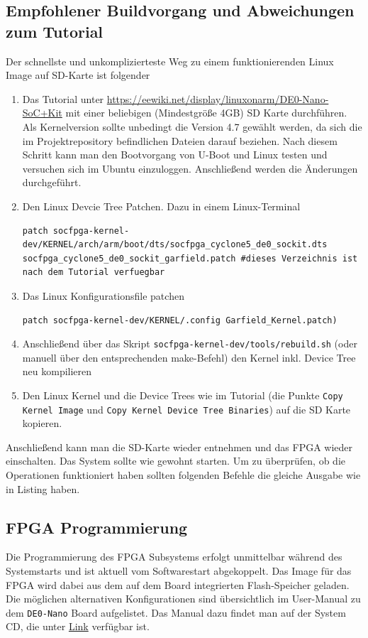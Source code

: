 \subsection{Empfohlener Buildvorgang und Abweichungen zum Tutorial}
Der schnellste und unkomplizierteste Weg zu einem funktionierenden Linux Image auf SD-Karte ist folgender
\begin{enumerate}
	\item Das Tutorial unter \href{https://eewiki.net/display/linuxonarm/DE0-Nano-SoC+Kit}{https://eewiki.net/display/linuxonarm/DE0-Nano-SoC+Kit} mit einer beliebigen (Mindestgröße 4GB) SD Karte durchführen. Als Kernelversion sollte unbedingt die Version 4.7 gewählt werden, da sich die im Projektrepository befindlichen Dateien darauf beziehen. Nach diesem Schritt kann man den Bootvorgang von U-Boot und Linux testen und versuchen sich im Ubuntu einzuloggen. Anschließend werden die Änderungen durchgeführt.
	\item Den Linux Devcie Tree Patchen. Dazu in einem Linux-Terminal
\lstset{language=bash}
	\begin{lstlisting}[breaklines=true]
patch socfpga-kernel-dev/KERNEL/arch/arm/boot/dts/socfpga_cyclone5_de0_sockit.dts socfpga_cyclone5_de0_sockit_garfield.patch #dieses Verzeichnis ist nach dem Tutorial verfuegbar
	\end{lstlisting}
	\item Das Linux Konfigurationsfile patchen
	\begin{lstlisting}[breaklines=true]
patch socfpga-kernel-dev/KERNEL/.config Garfield_Kernel.patch)
	\end{lstlisting}
	\item Anschließend über das Skript \texttt{socfpga-kernel-dev/tools/rebuild.sh} (oder manuell über den entsprechenden make-Befehl) den Kernel inkl. Device Tree neu kompilieren
	\item Den Linux Kernel und die Device Trees wie im Tutorial (die Punkte \texttt{Copy Kernel Image} und \texttt{Copy Kernel Device Tree Binaries}) auf die SD Karte kopieren.
\end{enumerate}

Anschließend kann man die SD-Karte wieder entnehmen und das \ac{FPGA} wieder einschalten. Das System sollte wie gewohnt starten. Um zu überprüfen, ob die Operationen funktioniert haben sollten folgenden Befehle die gleiche Ausgabe wie in Listing  haben.

\subsection{\ac{FPGA} Programmierung}
Die Programmierung des \ac{FPGA} Subsystems erfolgt unmittelbar während des Systemstarts und ist aktuell vom Softwarestart abgekoppelt. Das Image für das \ac{FPGA} wird dabei aus dem auf dem Board integrierten Flash-Speicher geladen. Die möglichen alternativen Konfigurationen sind übersichtlich im User-Manual zu dem \texttt{DE0-Nano} Board aufgelistet. Das Manual dazu findet man auf der System CD, die unter \href{http://www.terasic.com/downloads/cd-rom/de0-nano-soc/}{Link} verfügbar ist.\\

